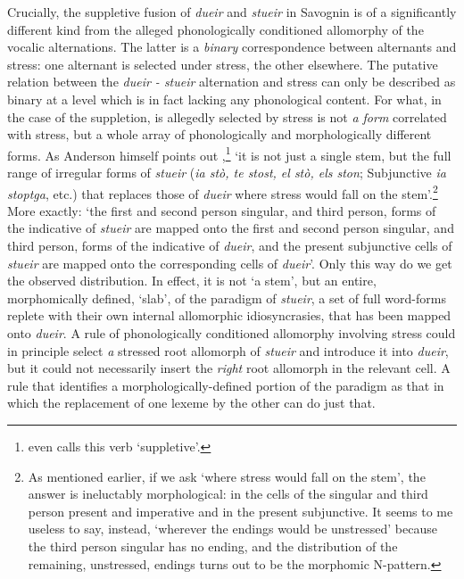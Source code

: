\documentclass[output=paper,
modfonts
]{LSP/langsci}
\begin{document}
Crucially, the suppletive fusion of \emph{dueir} and \emph{stueir} in
Savognin is of a significantly different kind from the alleged
phonologically conditioned allomorphy of the vocalic alternations. The
latter is a \emph{binary} correspondence between alternants and stress:
one alternant is selected under stress, the other elsewhere. The
putative relation between the \emph{dueir - stueir} alternation and
stress can only be described as binary at a level which is in fact
lacking any phonological content. For what, in the case of the
suppletion, is allegedly selected by stress is not \emph{a form}
correlated with stress, but a whole array of phonologically and
morphologically different forms. As Anderson himself points out
\citeyear[124]{anderson2008a},\footnote{\citet[29]{anderson2010a} even calls this verb
  `suppletive'.} `it is not just a single stem, but the full range of
irregular forms of \emph{stueir} (\emph{ia stò, te stost, el stò, els
ston}; Subjunctive \emph{ia stoptga}, etc.) that replaces those of
\emph{dueir} where stress would fall on the stem'.\footnote{As mentioned
  earlier, if we ask `where stress would fall on the stem', the answer
  is ineluctably morphological: in the cells of the singular and third
  person present and imperative and in the present subjunctive. It seems
  to me useless to say, instead, `wherever the endings would be
  unstressed' because the third person singular has no ending, and the
  distribution of the remaining, unstressed, endings turns out to be the
  morphomic N-pattern.} More exactly: `the first and second person
singular, and third person, forms of the indicative of \emph{stueir} are
mapped onto the first and second person singular, and third person,
forms of the indicative of \emph{dueir}, and the present subjunctive
cells of \emph{stueir} are mapped onto the corresponding cells of
\emph{dueir}'. Only this way do we get the observed distribution. In
effect, it is not `a stem', but an entire, morphomically defined,
`slab', of the paradigm of \emph{stueir}, a set of full word-forms
replete with their own internal allomorphic idiosyncrasies, that has
been mapped onto \emph{dueir}. A rule of phonologically conditioned
allomorphy involving stress could in principle select \emph{a} stressed
root allomorph of \emph{stueir} and introduce it into \emph{dueir}, but
it could not necessarily insert the \emph{right} root allomorph in the
relevant cell. A rule that identifies a morphologically-defined portion
of the paradigm as that in which the replacement of one lexeme by the
other can do just that.
\end{document}
